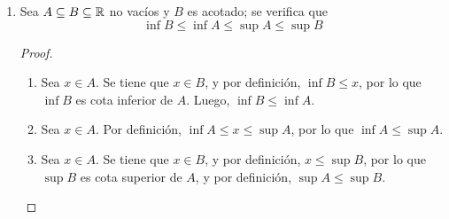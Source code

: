 \begin{enumerate}[label=\roman*)]
  \item Sea $A\subseteq B\subseteq \mathbb{R}$ no vacíos y $B$ es acotado; se verifica que \[\inf B \leq \inf A \leq \sup A \leq \sup B\]

\begin{proof}\leavevmode
  \begin{enumerate}[label=\roman*)]
    \item Sea $x\in A$. Se tiene que $x\in B$, y por definición, $\inf B \leq x$, por lo que $\inf B$ es cota inferior de $A$. Luego, $\inf B \leq \inf A$.
    \item Sea $x\in A$. Por definición, $\inf A \leq x \leq \sup A$, por lo que $\inf A \leq \sup A$.
    \item Sea $x\in A$. Se tiene que $x\in B$, y por definición, $x\leq \sup B$, por lo que $\sup B$ es cota superior de $A$, y por definición, $\sup A \leq \sup B$.
  \end{enumerate}
\end{proof}
  
\end{enumerate}